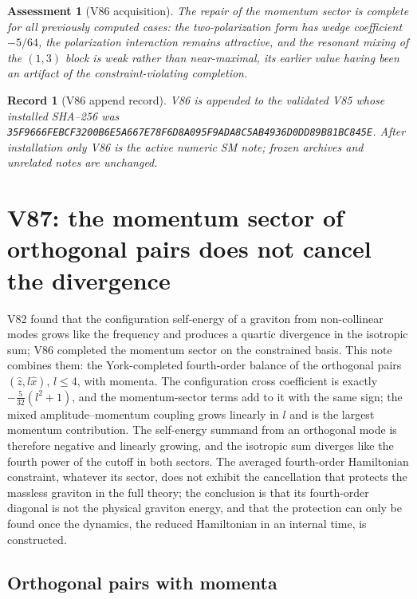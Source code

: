 \documentclass[11pt]{article}
\newtheorem{assessment}[theorem]{Assessment}
\newtheorem{record}[theorem]{Record}
\theoremstyle{remark}
\begin{document}
\begin{assessment}[V86 acquisition]
\label{ass:v19v86}
The repair of the momentum sector is complete for all previously
computed cases: the two-polarization form has wedge coefficient
\(-5/64\), the polarization interaction remains attractive, and the
resonant mixing of the \((1,3)\) block is weak rather than
near-maximal, its earlier value having been an artifact of the
constraint-violating completion.
\end{assessment}

\begin{record}[V86 append record]
\label{rec:v19v86}
V86 is appended to the validated V85 whose installed SHA--256 was
\texttt{35F9666FEBCF3200B6E5A667E78F6D8A095F9ADA8C5AB4936D0DD89B81BC845E}.
After installation only V86 is the active numeric SM note; frozen
archives and unrelated notes are unchanged.
\end{record}


\section{V87: the momentum sector of orthogonal pairs does not cancel the divergence}
\label{sec:v19v87}

V82 found that the configuration self-energy of a graviton from
non-collinear modes grows like the frequency and produces a quartic
divergence in the isotropic sum; V86 completed the momentum sector on
the constrained basis.  This note combines them: the York-completed
fourth-order balance of the orthogonal pairs \((\hat z,l\hat x)\),
\(l\leq4\), with momenta.  The configuration cross coefficient is
exactly \(-\tfrac5{32}(l^2+1)\), and the momentum-sector terms add to
it with the same sign; the mixed amplitude--momentum coupling grows
linearly in \(l\) and is the largest momentum contribution.  The
self-energy summand from an orthogonal mode is therefore negative and
linearly growing, and the isotropic sum diverges like the fourth power
of the cutoff in both sectors.  The averaged fourth-order Hamiltonian
constraint, whatever its sector, does not exhibit the cancellation
that protects the massless graviton in the full theory; the
conclusion is that its fourth-order diagonal is not the physical
graviton energy, and that the protection can only be found once the
dynamics, the reduced Hamiltonian in an internal time, is constructed.

\subsection{Orthogonal pairs with momenta}
\end{document}
